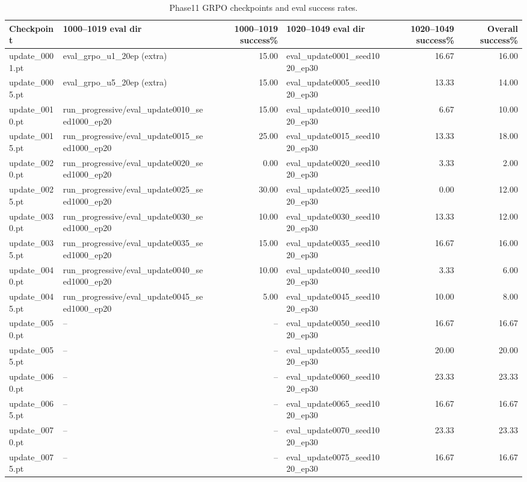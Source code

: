 \begin{table}[htbp]
\centering
\begin{tabular}{l l r l r r}
\hline
Checkpoint & 1000--1019 eval dir & 1000--1019 success\% & 1020--1049 eval dir & 1020--1049 success\% & Overall success\% \\ 
\hline
update\_0001.pt & eval\_grpo\_u1\_20ep (extra) & 15.00 & eval\_update0001\_seed1020\_ep30 & 16.67 & 16.00 \\
update\_0005.pt & eval\_grpo\_u5\_20ep (extra) & 15.00 & eval\_update0005\_seed1020\_ep30 & 13.33 & 14.00 \\
update\_0010.pt & run\_progressive/eval\_update0010\_seed1000\_ep20 & 15.00 & eval\_update0010\_seed1020\_ep30 & 6.67 & 10.00 \\
update\_0015.pt & run\_progressive/eval\_update0015\_seed1000\_ep20 & 25.00 & eval\_update0015\_seed1020\_ep30 & 13.33 & 18.00 \\
update\_0020.pt & run\_progressive/eval\_update0020\_seed1000\_ep20 & 0.00 & eval\_update0020\_seed1020\_ep30 & 3.33 & 2.00 \\
update\_0025.pt & run\_progressive/eval\_update0025\_seed1000\_ep20 & 30.00 & eval\_update0025\_seed1020\_ep30 & 0.00 & 12.00 \\
update\_0030.pt & run\_progressive/eval\_update0030\_seed1000\_ep20 & 10.00 & eval\_update0030\_seed1020\_ep30 & 13.33 & 12.00 \\
update\_0035.pt & run\_progressive/eval\_update0035\_seed1000\_ep20 & 15.00 & eval\_update0035\_seed1020\_ep30 & 16.67 & 16.00 \\
update\_0040.pt & run\_progressive/eval\_update0040\_seed1000\_ep20 & 10.00 & eval\_update0040\_seed1020\_ep30 & 3.33 & 6.00 \\
update\_0045.pt & run\_progressive/eval\_update0045\_seed1000\_ep20 & 5.00 & eval\_update0045\_seed1020\_ep30 & 10.00 & 8.00 \\
update\_0050.pt & -- & -- & eval\_update0050\_seed1020\_ep30 & 16.67 & 16.67 \\
update\_0055.pt & -- & -- & eval\_update0055\_seed1020\_ep30 & 20.00 & 20.00 \\
update\_0060.pt & -- & -- & eval\_update0060\_seed1020\_ep30 & 23.33 & 23.33 \\
update\_0065.pt & -- & -- & eval\_update0065\_seed1020\_ep30 & 16.67 & 16.67 \\
update\_0070.pt & -- & -- & eval\_update0070\_seed1020\_ep30 & 23.33 & 23.33 \\
update\_0075.pt & -- & -- & eval\_update0075\_seed1020\_ep30 & 16.67 & 16.67 \\
\hline
\end{tabular}
\caption{Phase11 GRPO checkpoints and eval success rates.}
\label{tab:phase11-eval-success}
\end{table}
